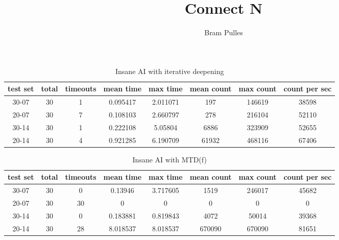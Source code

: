 \documentclass[a4paper]{article}
\author{Bram Pulles}
\title{\textbf{Connect N}}
\begin{document}
\maketitle

\begin{table}[h]
	\centering
	\begin{adjustbox}{center}
	\begin{tabular}{|c|c|c|c|c|c|c|c|}\hline
	\textbf{test set} & \textbf{total} & \textbf{timeouts} & \textbf{mean time} & \textbf{max time} & \textbf{mean count} & \textbf{max count} & \textbf{count per sec} \\\hline
	30-07 & 30 & 1 & 0.095417 & 2.011071 & 197 & 146619 & 38598 \\\hline
	20-07 & 30 & 7 & 0.108103 & 2.660797 & 278 & 216104 & 52110 \\\hline
	30-14 & 30 & 1 & 0.222108 & 5.05804 & 6886 & 323909 & 52655 \\\hline
	20-14 & 30 & 4 & 0.921285 & 6.190709 & 61932 & 468116 & 67406 \\\hline
	\end{tabular}
	\end{adjustbox}
	\caption{Insane AI with iterative deepening}
	\label{tab: }
\end{table}

\begin{table}[h]
	\centering
	\begin{adjustbox}{center}
	\begin{tabular}{|c|c|c|c|c|c|c|c|}\hline
	\textbf{test set} & \textbf{total} & \textbf{timeouts} & \textbf{mean time} & \textbf{max time} & \textbf{mean count} & \textbf{max count} & \textbf{count per sec} \\\hline
	30-07 & 30 & 0 & 0.13946 & 3.717605 & 1519 & 246017 & 45682 \\\hline
	20-07 & 30 & 30 & 0 & 0 & 0 & 0 & 0 \\\hline
	30-14 & 30 & 0 & 0.183881 & 0.819843 & 4072 & 50014 & 39368 \\\hline
	20-14 & 30 & 28 & 8.018537 & 8.018537 & 670090 & 670090 & 81651 \\\hline
	\end{tabular}
	\end{adjustbox}
	\caption{Insane AI with MTD(f)}
	\label{tab: }
\end{table}
\end{document}
